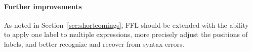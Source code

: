 
\paragraph{Further improvements} 
As noted in Section~\ref{sec:shortcomings}, FFL should be extended with the ability to apply one label to multiple expressions, more precisely adjust the positions of labels, and better recognize and recover from syntax errors.



\vspace{2.5ex}


